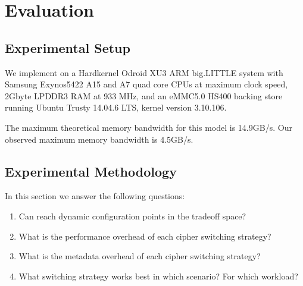 \section{Evaluation}\label{sec:evaluation}

\subsection{Experimental Setup}

We implement \SYSTEM{} on a Hardkernel Odroid XU3 ARM big.LITTLE system with
Samsung Exynos5422 A15 and A7 quad core CPUs at maximum clock speed, 2Gbyte
LPDDR3 RAM at 933 MHz, and an eMMC5.0 HS400 backing store running Ubuntu Trusty
14.04.6 LTS, kernel version 3.10.106.

The maximum theoretical memory bandwidth for this model is 14.9GB/s\@. Our
observed maximum memory bandwidth is 4.5GB/s.

\subsection{Experimental Methodology}

In this section we answer the following questions:

\begin{enumerate}
 \item Can \SYSTEM{} reach dynamic configuration points in the tradeoff space?
 \item What is the performance overhead of each cipher switching strategy?
 \item What is the metadata overhead of each cipher switching strategy?
 \item What switching strategy works best in which scenario? For which workload?
\end{enumerate}






